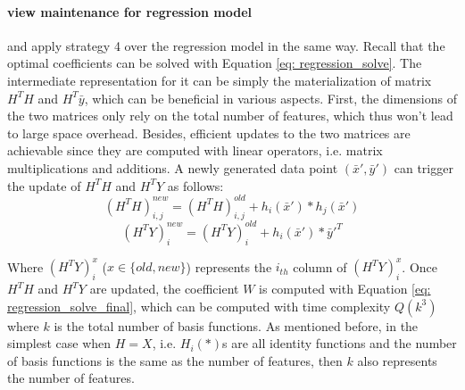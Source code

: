 \paragraph{view maintenance for regression model} \cite{deshpande2006mauvedb} and \cite{gupta2015processing} apply strategy 4 over the regression model in the same way. Recall that the optimal coefficients can be solved with Equation \ref{eq: regression_solve}. The intermediate representation for it can be simply the materialization of matrix $H^TH$ and $H^T\bar{y}$, which can be beneficial in various aspects. First, the dimensions of the two matrices only rely on the total number of features, which thus won't lead to large space overhead. Besides, efficient updates to the two matrices are achievable since they are computed with linear operators, i.e. matrix multiplications and additions. A newly generated data point $(\bar{x}',\bar{y}')$ can trigger the update of $H^TH$ and $H^TY$ as follows:
\begin{equation}
    (H^TH)^{new}_{i,j} = (H^TH)^{old}_{i,j} + h_i(\bar{x}')*h_j(\bar{x}')
\end{equation}
\begin{equation}
    (H^TY)^{new}_i = (H^TY)^{old}_i + h_i(\bar{x}')*\bar{y}'^T
\end{equation}

Where $(H^TY)^{x}_i$ ($x \in \{old, new\}$) represents the $i_{th}$ column of $(H^TY)^{x}_i$. Once $H^TH$ and $H^TY$ are updated, the coefficient $W$ is computed with Equation \ref{eq: regression_solve_final}, 
which can be computed with time complexity $Q(k^3)$ where $k$ is the total number of basis functions. As mentioned before, in the simplest case when $H=X$, i.e. $H_i(*)$s are all identity functions and the number of basis functions is the same as the number of features, then $k$ also represents the number of features.

